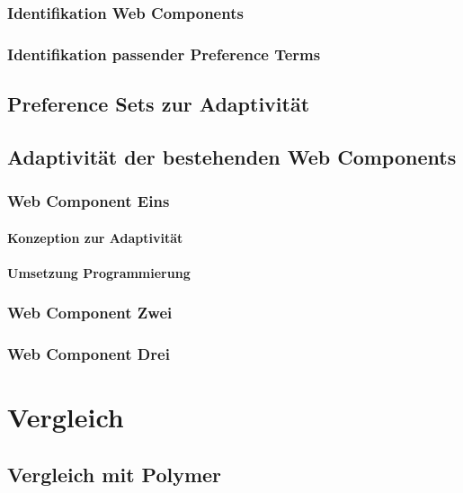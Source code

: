 \documentclass[12pt, paper=a4, bibtotoc, toc=listof]{scrreprt}
\begin{document}
			\subsection{Identifikation Web Components}
			\subsection{Identifikation passender Preference Terms}
		\section{Preference Sets zur Adaptivität}
		\section{Adaptivität der bestehenden Web Components}
			\subsection{Web Component Eins}
				\subsubsection{Konzeption zur Adaptivität}
				\subsubsection{Umsetzung Programmierung}
			\subsection{Web Component Zwei}
			\subsection{Web Component Drei}
	\chapter{Vergleich}
		\section{Vergleich mit Polymer}

	\printbibliography
\end{document}
